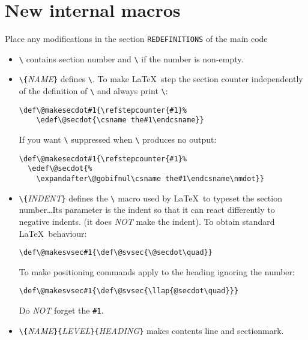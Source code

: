 \documentclass[pagesize=auto, numbers=enddot]{scrartcl}
\makeatletter
\newcommand*{\cs}[1]{\texttt{\textbackslash#1}}
\newcommand*{\cmd}[1]{\cs{\expandafter\@gobble\string#1}}
\newcommand*{\meta}[1]{\textlangle\textsl{#1}\textrangle}
\newcommand*{\marg}[1]{\texttt{\{}\meta{#1}\texttt{\}}}
\makeatother
\begin{document}
\section{New internal macros}
\label{sec:7}

Place any modifications in the section \texttt{REDEFINITIONS} of the main code
%
\begin{itemize}
\item \cmd{\@secdot} contains section number and \cmd{\nmdot} if the number is non-empty.

\item \cmd{\@makesecdot}\marg{NAME} defines \cmd{\@secdot}.
  To make \LaTeX\ step the section counter independently of the definition
  of \cmd{\thesection} and always print \cmd{\nmdot}:
\begin{verbatim}
\def\@makesecdot#1{\refstepcounter{#1}%
    \edef\@secdot{\csname the#1\endcsname}}
\end{verbatim}
  If you want \cmd{\nmdot} suppressed when \cmd{\thesection} produces no output:
\begin{verbatim}
\def\@makesecdot#1{\refstepcounter{#1}%
  \edef\@secdot{%
    \expandafter\@gobifnul\csname the#1\endcsname\nmdot}}
\end{verbatim}

\item \cmd{\@makesvsec}\marg{INDENT} defines the \cmd{\@svsec} macro used by \LaTeX\ to typeset the
  section number\dots Its parameter is the indent so that it can react
  differently to negative indents. (it does \emph{NOT} make the indent).
  To obtain standard \LaTeX\ behaviour:
\begin{verbatim}
\def\@makesvsec#1{\def\@svsec{\@secdot\quad}}
\end{verbatim}
  To make positioning commands apply to the heading ignoring the number:
\begin{verbatim}
\def\@makesvsec#1{\def\@svsec{\llap{@secdot\quad}}}
\end{verbatim}
  Do \emph{NOT} forget the \verb+#1+.

\item \cmd{\@contmark}\marg{NAME}\marg{LEVEL}\marg{HEADING} makes contents line and sectionmark.
\end{itemize}
\end{document}
